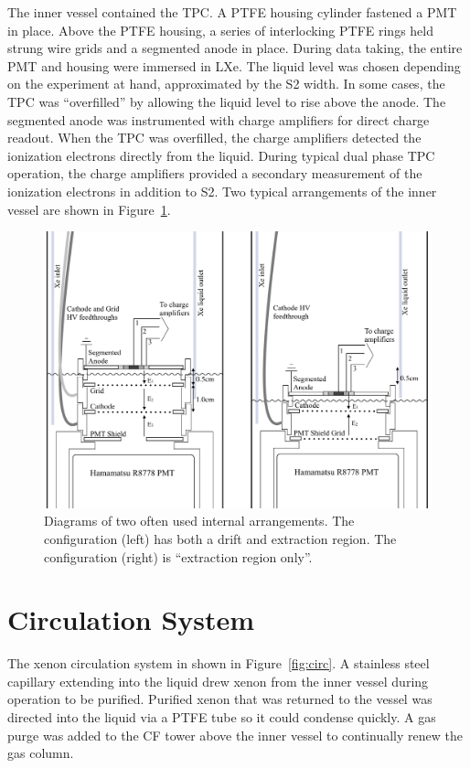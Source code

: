 The inner vessel contained the \ac{TPC}. A \ac{PTFE} housing cylinder fastened a \ac{PMT} in place. Above the \ac{PTFE} housing, a series of interlocking \ac{PTFE} rings held strung wire grids and a segmented anode in place. During data taking, the entire \ac{PMT} and housing were immersed in \ac{LXe}. The liquid level was chosen depending on the experiment at hand, approximated by the S2 width. In some cases, the TPC was ``overfilled'' by allowing the liquid level to rise above the anode. The segmented anode was instrumented with charge amplifiers for direct charge readout. When the \ac{TPC} was overfilled, the charge amplifiers detected the ionization electrons directly from the liquid. During typical dual phase \ac{TPC} operation, the charge amplifiers provided a secondary measurement of the ionization electrons in addition to S2. Two typical arrangements of the inner vessel are shown in Figure~\ref{fig:internals}.

\begin{figure}[htbp]
\begin{center}
\includegraphics[width=\textwidth]{figures/testbed/internals_1and2.png}
\caption{Diagrams of two often used internal arrangements. The configuration (left) has both a drift and extraction region. The configuration (right) is ``extraction region only''. }
\label{fig:internals}
\end{center}
\end{figure}


\section{Circulation System}
The xenon circulation system in shown in Figure~\ref{fig:circ}. A stainless steel capillary extending into the liquid drew xenon from the inner vessel during operation to be purified. Purified xenon that was returned to the vessel was directed into the liquid via a \ac{PTFE} tube so it could condense quickly. A gas purge was added to the \ac{CF} tower above the inner vessel to continually renew the gas column. 


